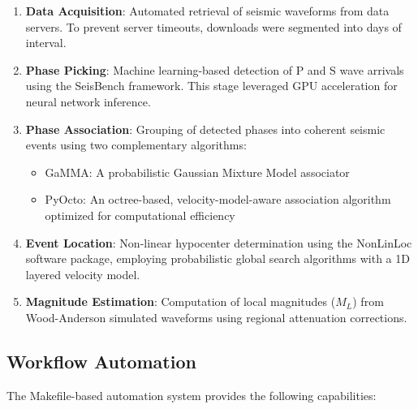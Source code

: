 \begin{enumerate}
  \item \textbf{Data Acquisition}: Automated retrieval of seismic waveforms
    from data servers. To prevent server timeouts, downloads were
    segmented into
    days of interval.

  \item \textbf{Phase Picking}: Machine learning-based detection of P and S
    wave arrivals using the SeisBench framework. This stage leveraged GPU
    acceleration for neural network inference.

  \item \textbf{Phase Association}: Grouping of detected phases into coherent
    seismic events using two complementary algorithms:
    \begin{itemize}
      \item GaMMA: A probabilistic Gaussian Mixture Model associator
      \item PyOcto: An octree-based, velocity-model-aware association algorithm
        optimized for computational efficiency
    \end{itemize}

  \item \textbf{Event Location}: Non-linear hypocenter determination using the
    NonLinLoc software package, employing probabilistic global
    search algorithms
    with a 1D layered velocity model.

  \item \textbf{Magnitude Estimation}: Computation of local magnitudes ($M_L$)
    from Wood-Anderson simulated waveforms using regional attenuation
    corrections.
\end{enumerate}

\subsection{Workflow Automation}
The Makefile-based automation system provides the following capabilities:

